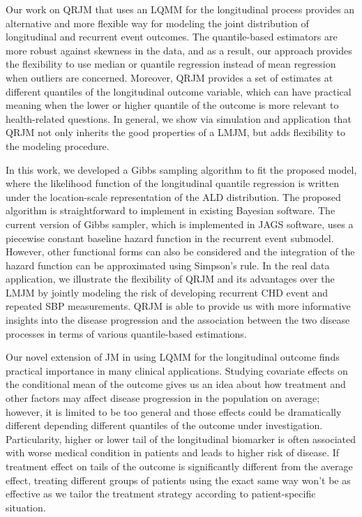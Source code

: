 Our work on QRJM that uses an LQMM for the longitudinal process provides an alternative and more flexible way for modeling the joint distribution of longitudinal and recurrent event outcomes. The quantile-based estimators are more robust against skewness in the data, and as a result, our approach provides the flexibility to use median or quantile regression instead of mean regression when outliers are concerned. Moreover, QRJM provides a set of estimates at different quantiles of the longitudinal outcome variable, which can have practical meaning when the lower or higher quantile of the outcome is more relevant to health-related questions. In general, we show via simulation and application that QRJM not only inherits the good properties of a LMJM, but adds flexibility to the modeling procedure.

In this work, we developed a Gibbs sampling algorithm to fit the proposed model, where the likelihood function of the longitudinal quantile regression is written under the location-scale representation of the ALD distribution. The proposed algorithm is straightforward to implement in existing Bayesian software. The current version of Gibbs sampler, which is implemented in \textsf{JAGS} software, uses a piecewise constant baseline hazard function in the recurrent event submodel. However, other functional forms can also be considered and the integration of the hazard function can be approximated using Simpson's rule. In the real data application, we illustrate the flexibility of QRJM and its advantages over the LMJM by jointly modeling the risk of developing recurrent CHD event and repeated SBP measurements. QRJM is able to provide us with more informative insights into the disease progression and the association between the two disease processes in terms of various quantile-based estimations.

Our novel extension of JM in using LQMM for the longitudinal outcome finds practical importance in many clinical applications. Studying covariate effects on the conditional mean of the outcome gives us an idea about how treatment and other factors may affect disease progression in the population on average; however, it is limited to be too general and those effects could be dramatically different depending different quantiles of the outcome under investigation. Particularity, higher or lower tail of the longitudinal biomarker is often associated with worse medical condition in patients and leads to higher risk of disease. If treatment effect on tails of the outcome is significantly different from the average effect, treating different groups of patients using the exact same way won't be as effective as we tailor the treatment strategy according to patient-specific situation.

